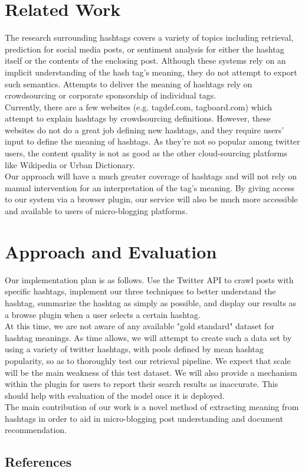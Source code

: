 \documentclass{sig-alternate}
\begin{document}
\section{Related Work}
The research surrounding hashtags covers a variety of topics including retrieval\cite{efron:retrieval}, prediction\cite{khabiri:predict}\cite{tagspace} for social media posts, or sentiment analysis for either the hashtag itself or the contents of the enclosing post.  Although these systems rely on an implicit understanding of the hash tag's meaning, they do not attempt to export such semantics.  Attempts to deliver the meaning of hashtags rely on crowdsourcing or corporate sponsorship of individual tags.\\
Currently, there are a few websites (e.g. tagdef.com, tagboard.com) which attempt to explain hashtags by crowdsourcing definitions. However, these websites do not do a great job defining new hashtags, and they require users’ input to define the meaning of hashtags. As they’re not so popular among twitter users, the content quality is not as good as the other cloud-sourcing platforms like Wikipedia or Urban Dictionary.\\
Our approach will have a much greater coverage of hashtags and will not rely on manual intervention for an interpretation of the tag's meaning.  By giving access to our system via a browser plugin, our service will also be much more accessible and available to users of micro-blogging platforms.\\

\section{Approach and Evaluation}
Our implementation plan is as follows. Use the Twitter API to crawl posts with specific hashtags, implement our three techniques to better understand the hashtag, summarize the hashtag as simply as possible, and display our results as a browse plugin when a user selects a certain hashtag.\\
  At this time, we are not aware of any available "gold standard" dataset for hashtag meanings.  As time allows, we will attempt to create such a data set by using a variety of twitter hashtags, with pools defined by mean hashtag popularity, so as to thoroughly test our retrieval pipeline.  We expect that scale will be the main weakness of this test dataset.  We will also provide a mechanism within the plugin for users to report their search results as inaccurate.  This should help with evaluation of the model once it is deployed.\\
The main contribution of our work is a novel method of extracting meaning from hashtags in order to aid in micro-blogging post understanding and document recommendation.\\

\subsection{References}


\end{document}
